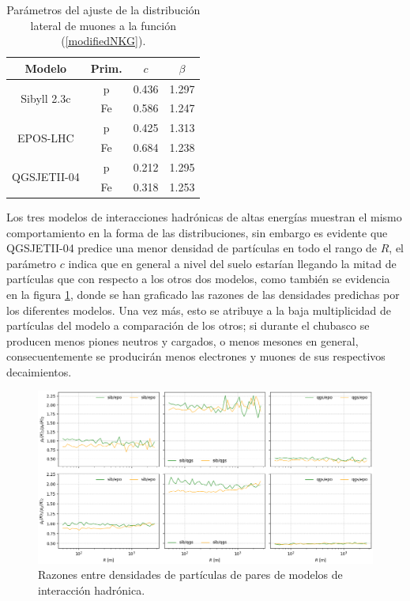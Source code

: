 \begin{table}[] 
\centering
\caption{Parámetros del ajuste de la distribución lateral de muones a la función (\ref{modifiedNKG}).}
\begin{tabular}{c|c|cc}
Modelo                       & Prim. & $c$   & $\beta$ \\ \hline
\multirow{2}{*}{Sibyll 2.3c} & p     & 0.436 & 1.297   \\
                             & Fe    & 0.586 & 1.247   \\ \hline
\multirow{2}{*}{EPOS-LHC}    & p     & 0.425 & 1.313   \\
                             & Fe    & 0.684 & 1.238   \\ \hline
\multirow{2}{*}{QGSJETII-04} & p     & 0.212 & 1.295   \\
                             & Fe    & 0.318 & 1.253   \\ \hline
\end{tabular}
\label{mudistlat_params}
\end{table}

	Los tres modelos de interacciones hadrónicas de altas energías muestran el mismo comportamiento en la forma de las distribuciones, sin embargo es evidente que QGSJETII-04 predice una menor densidad de partículas en todo el rango de $R$, el parámetro $c$ indica que en general a nivel del suelo estarían llegando la mitad de partículas que con respecto a los otros dos modelos, como también se evidencia en la figura \ref{fig:distlat_modelos}, donde se han graficado las razones de las densidades predichas por los diferentes modelos. Una vez más, esto se atribuye a la baja multiplicidad de partículas del modelo a comparación de los otros; si durante el chubasco se producen menos piones neutros y cargados, o menos mesones en general, consecuentemente se producirán menos electrones y muones de sus respectivos decaimientos. \\
	
\begin{figure}[] 
\centering
\includegraphics[width=\textwidth]{Figuras/distlat_models}
\caption{Razones entre densidades de partículas de pares de modelos de interacción hadrónica.}
\label{fig:distlat_modelos}
\end{figure}

